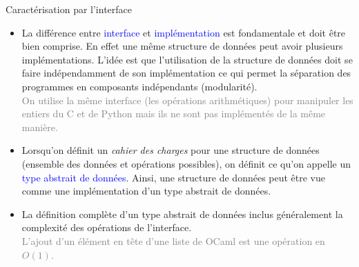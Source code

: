 \documentclass[10pt]{beamer}
\begin{document}
\begin{frame}{\Ctitle}{\stitle}
	\begin{alertblock}{Caractérisation par l'interface}
		\begin{itemize}
			\item<1-> La différence entre \textcolor{blue}{interface} et \textcolor{blue}{implémentation} est fondamentale et doit être bien comprise. En effet une même structure de données peut avoir plusieurs implémentations. L'idée est que l'utilisation de la structure de données  doit se faire indépendamment de son implémentation ce qui permet la séparation des programmes en composants indépendants (modularité).\\
				\textcolor{gray}{On utilise la même interface (les opérations arithmétiques) pour manipuler les entiers du C et de Python mais ils ne sont pas implémentés de la même manière.}
			\item<2-> Lorsqu'on définit un \textit{cahier des charges} pour une structure de données (ensemble des données et opérations possibles), on définit ce qu'on appelle un \textcolor{blue}{type abstrait de données}.  Ainsi, une structure de données peut être vue comme une implémentation d'un type abstrait de données.
			\item<3-> La définition complète d'un type abstrait de données inclus généralement la complexité des opérations de l'interface. \\
				\textcolor{gray}{L'ajout d'un élément en tête d'une liste de OCaml est une opération en $O(1)$.}
		\end{itemize}
	\end{alertblock}
\end{frame}
\end{document}
